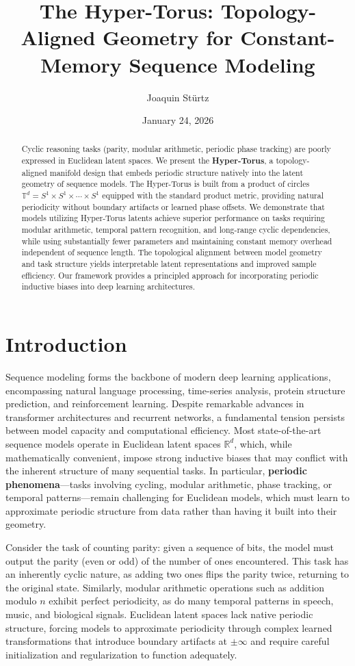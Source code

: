 \documentclass[12pt,letterpaper,twoside]{article}
\title{The Hyper-Torus: Topology-Aligned Geometry for Constant-Memory Sequence Modeling}
\author{Joaquin Stürtz}
\date{January 24, 2026}
\affil{Independent Researcher}
\newcommand{\R}{\mathbb{R}}
\newcommand{\T}{\mathbb{T}}
\begin{document}
\maketitle

\begin{abstract}
Cyclic reasoning tasks (parity, modular arithmetic, periodic phase tracking) are poorly expressed in Euclidean latent spaces. We present the \textbf{Hyper-Torus}, a topology-aligned manifold design that embeds periodic structure natively into the latent geometry of sequence models. The Hyper-Torus is built from a product of circles $\T^d = S^1 \times S^1 \times \cdots \times S^1$ equipped with the standard product metric, providing natural periodicity without boundary artifacts or learned phase offsets. We demonstrate that models utilizing Hyper-Torus latents achieve superior performance on tasks requiring modular arithmetic, temporal pattern recognition, and long-range cyclic dependencies, while using substantially fewer parameters and maintaining constant memory overhead independent of sequence length. The topological alignment between model geometry and task structure yields interpretable latent representations and improved sample efficiency. Our framework provides a principled approach for incorporating periodic inductive biases into deep learning architectures.
\end{abstract}

\section{Introduction}
Sequence modeling forms the backbone of modern deep learning applications, encompassing natural language processing, time-series analysis, protein structure prediction, and reinforcement learning. Despite remarkable advances in transformer architectures and recurrent networks, a fundamental tension persists between model capacity and computational efficiency. Most state-of-the-art sequence models operate in Euclidean latent spaces $\R^d$, which, while mathematically convenient, impose strong inductive biases that may conflict with the inherent structure of many sequential tasks. In particular, \textbf{periodic phenomena}—tasks involving cycling, modular arithmetic, phase tracking, or temporal patterns—remain challenging for Euclidean models, which must learn to approximate periodic structure from data rather than having it built into their geometry.

Consider the task of counting parity: given a sequence of bits, the model must output the parity (even or odd) of the number of ones encountered. This task has an inherently cyclic nature, as adding two ones flips the parity twice, returning to the original state. Similarly, modular arithmetic operations such as addition modulo $n$ exhibit perfect periodicity, as do many temporal patterns in speech, music, and biological signals. Euclidean latent spaces lack native periodic structure, forcing models to approximate periodicity through complex learned transformations that introduce boundary artifacts at $\pm\infty$ and require careful initialization and regularization to function adequately.
\end{document}
